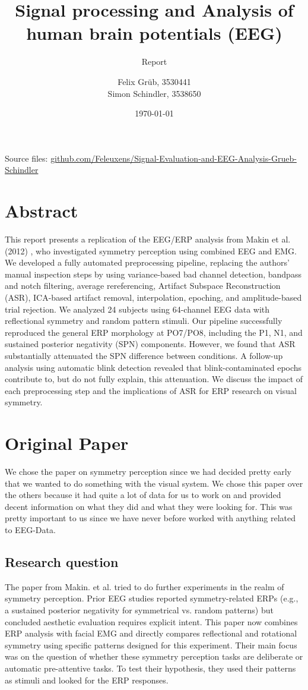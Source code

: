 \documentclass{scrartcl}
\title{Signal processing and Analysis of human brain potentials (EEG)}
\subtitle{Report}
\author{Felix Grüb, 3530441\\Simon Schindler, 3538650}
\date{\today}
\begin{document}
\maketitle

\vfill
Source files: \href{https://github.com/Feleuxens/Signal-Evaluation-and-EEG-Analysis-Grueb-Schindler}{github.com/Feleuxens/Signal-Evaluation-and-EEG-Analysis-Grueb-Schindler}

\newpage
\section*{Abstract}
This report presents a replication of the EEG/ERP analysis from Makin et al. (2012) \cite{paper}, who investigated symmetry perception using combined EEG and EMG. We developed a fully automated preprocessing pipeline, replacing the authors' manual inspection steps by using variance-based bad channel detection, bandpass and notch filtering, average rereferencing, Artifact Subspace Reconstruction (ASR), ICA-based artifact removal, interpolation, epoching, and amplitude-based trial rejection. We analyzed 24 subjects using 64-channel EEG data with reflectional symmetry and random pattern stimuli. Our pipeline successfully reproduced the general ERP morphology at PO7/PO8, including the P1, N1, and sustained posterior negativity (SPN) components. However, we found that ASR substantially attenuated the SPN difference between conditions. A follow-up analysis using automatic blink detection revealed that blink-contaminated epochs contribute to, but do not fully explain, this attenuation. We discuss the impact of each preprocessing step and the implications of ASR for ERP research on visual symmetry.

\newpage
\tableofcontents
\newpage

\section{Original Paper}
We chose the paper on symmetry perception since we had decided pretty early that we wanted to do something with the visual system.
We chose this paper over the others because it had quite a lot of data for us to work on and provided decent information on what they did and what they were looking for.
This was pretty important to us since we have never before worked with anything related to EEG-Data.

\subsection{Research question}
The paper from Makin. et al. \cite{paper} tried to do further experiments in the realm of symmetry perception.
Prior EEG studies reported symmetry-related ERPs (e.g., a sustained posterior negativity for symmetrical vs. random patterns) but concluded aesthetic evaluation requires explicit intent. 
This paper now combines ERP analysis with facial EMG and directly compares reflectional and rotational symmetry using specific patterns designed for this experiment.
Their main focus was on the question of whether these symmetry perception tasks are deliberate or automatic pre-attentive tasks.
To test their hypothesis, they used their patterns as stimuli and looked for the ERP responses.
\end{document}
